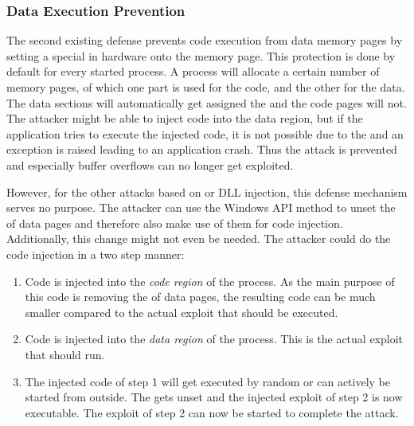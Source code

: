 \subsubsection{Data Execution Prevention}
The second existing defense prevents code execution from data memory pages by setting a special  \cite{msdn_dep} in hardware onto the memory page. This protection is done by default for every started process. A process will allocate a certain number of memory pages, of which one part is used for the code, and the other for the data. The data sections will automatically get assigned the  and the code pages will not. The attacker might be able to inject code into the data region, but if the application tries to execute the injected code, it is not possible due to the  and an exception is raised leading to an application crash. Thus the attack is prevented and especially buffer overflows can no longer get exploited.

However, for the other attacks based on  or DLL injection, this defense mechanism serves no purpose. The attacker can use the Windows API method  \cite{msdn_virtualprotect} to unset the  of data pages and therefore also make use of them for code injection. Additionally, this change might not even be needed. The attacker could do the code injection in a two step manner: 
\begin{enumerate}
\item Code is injected into the \emph{code region} of the process. As the main purpose of this code is removing the  of data pages, the resulting code can be much smaller compared to the actual exploit that should be executed.
\item Code is injected into the \emph{data region} of the process. This is the actual exploit that should run.
\item The injected code of step 1 will get executed by random or can actively be started from outside. The  gets unset and the injected exploit of step 2 is now executable. The exploit of step 2 can now be started to complete the attack.
\end{enumerate}